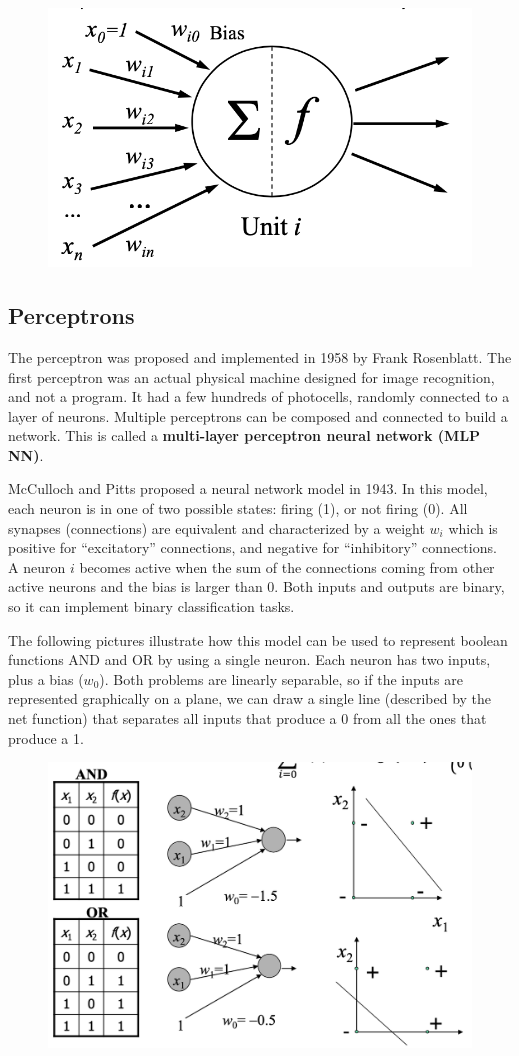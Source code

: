 \begin{figure}[ht]
    \centering
    \includegraphics[width=0.5\linewidth]{img/Neuron.png}
\end{figure}

\subsection{Perceptrons}

The perceptron was proposed and implemented in 1958 by Frank Rosenblatt. The first perceptron was an actual physical machine designed for image recognition, and not a program. It had a few hundreds of photocells, randomly connected to a layer of neurons. Multiple perceptrons can be composed and connected to build a network. This is called a \textbf{multi-layer perceptron neural network (MLP NN)}. 

McCulloch and Pitts proposed a neural network model in 1943. In this model, each neuron is in one of two possible states: firing (1), or not firing (0). All synapses (connections) are equivalent and characterized by a weight $w_i$ which is positive for ``excitatory'' connections, and negative for ``inhibitory'' connections. A neuron $i$ becomes active when the sum of the connections coming from other active neurons and the bias is larger than 0. Both inputs and outputs are binary, so it can implement binary classification tasks.

The following pictures illustrate how this model can be used to represent boolean functions AND and OR by using a single neuron. Each neuron has two inputs, plus a bias ($w_0$). Both problems are linearly separable, so if the inputs are represented graphically on a plane, we can draw a single line (described by the net function) that separates all inputs that produce a 0 from all the ones that produce a 1.

\begin{figure}[ht]
    \centering
    \includegraphics[width=0.5\linewidth]{img/boolean perceptron.png}
\end{figure}

